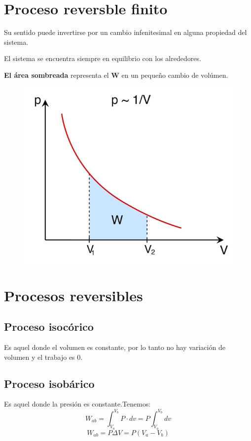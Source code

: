 \documentclass[12pt,twocolumn,a4paper]{report}
\begin{document}
\section*{Proceso reversble finito}
Su sentido puede invertirse por un cambio infenitesimal en alguna propiedad del sistema. 

El sistema se encuentra siempre en equilibrio con los alrededores.

\textbf{El área sombreada} representa el \textbf{W} en un pequeño cambio de volúmen.  
\begin{figure}[H]
\centering
\includegraphics[scale=0.3]{graficos/trab2.jpg}
\end{figure}

\section*{Procesos reversibles}
\subsection*{Proceso isocórico}
Es aquel donde el volumen es constante, por lo tanto no hay variación de volumen y el trabajo es 0.
\subsection*{Proceso isobárico}
Es aquel donde la presión es constante.Tenemos:
\begin{equation*}
W_{ab} = \int_{V_a}^{V_b} P \cdot dv = P \int_{V_a}^{V_b} dv
\end{equation*}
\begin{equation*}
W_{ab} = P \Delta V = P (V_a - V_b)
\end{equation*}
\end{document}
